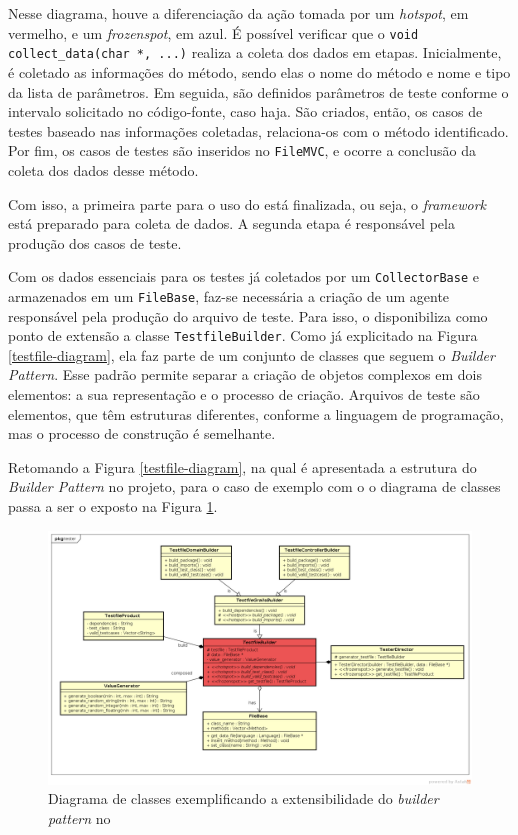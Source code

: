Nesse diagrama, houve a diferenciação da ação tomada por um \textit{hotspot}, em vermelho, e um \textit{frozenspot}, em azul. É possível verificar que o \lstinline|void collect_data(char *, ...)| realiza a coleta dos dados em etapas. Inicialmente, é coletado as informações do método, sendo elas o nome do método e nome e tipo da lista de parâmetros. Em seguida, são definidos parâmetros de teste conforme o intervalo solicitado no código-fonte, caso haja. São criados, então, os casos de testes baseado nas informações coletadas, relaciona-os com o método identificado. Por fim, os casos de testes são inseridos no \lstinline|FileMVC|, e ocorre a conclusão da coleta dos dados desse método.

Com isso, a primeira parte para o uso do \scarefault está finalizada, ou seja, o \textit{framework} está preparado para coleta de dados. A segunda etapa é responsável pela produção dos casos de teste.

Com os dados essenciais para os testes já coletados por um
\lstinline|CollectorBase| e armazenados em um \lstinline|FileBase|,
faz-se necessária a criação de um agente responsável pela
produção do arquivo de teste. Para isso, o \framework disponibiliza como
ponto de extensão a classe \lstinline|TestfileBuilder|. Como já explicitado
na Figura \ref{testfile-diagram}, ela faz parte de um conjunto de classes
que seguem o \textit{Builder Pattern}. Esse padrão permite separar a criação
de objetos complexos em dois elementos: a sua representação e o processo de
criação. Arquivos de teste são elementos, que têm estruturas diferentes, conforme
a linguagem de programação, mas o processo de construção é semelhante.

Retomando a Figura \ref{testfile-diagram}, na qual é apresentada a
estrutura do \textit{Builder Pattern} no projeto, para o caso de exemplo
com o \grails o diagrama de classes passa a ser o exposto na Figura
\ref{testfile-grails-class-diagram}.

\begin{figure}[h]
  \centering
    \includegraphics[width=\textwidth]{figuras/testfile-grails-class-diagram.png}
    \caption{Diagrama de classes exemplificando a extensibilidade do \textit{builder pattern} no \framework}
    \label{testfile-grails-class-diagram}
\end{figure}
\FloatBarrier

